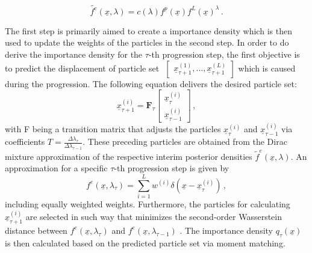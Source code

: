 \documentclass[a4paper]{IEEEtran}
\begin{document}
\begin{equation}
    \tilde{f^e}(\underline{x},\lambda) = c(\lambda)f^p(\underline{x})f^L(\underline{x})^{\lambda} \,.
    \label{eq:homtopy_importance_sampling}
\end{equation}

The first step is primarily aimed to create a importance density which is then used to update the weights of the particles in the second step.
In order to do derive the importance density for the $\tau$-th progression step, the first objective is to predict the displacement of particle set $\,\, \begin{bmatrix} \underline{x}_{\tau+1}^{(1)}, \dotsc, \underline{x}_{\tau+1}^{(L)} \end{bmatrix}$ which is caused during the progression.
The following equation delivers the desired particle set:
\begin{equation}
    \underline{x}_{\tau + 1}^{(i)} = \textbf{F}_{\tau}
        \begin{bmatrix}
            \underline{x}_{\tau}^{(i)} \\ 
            \underline{x}_{\tau -1}^{(i)}
        \end{bmatrix} \,,
\end{equation}
with F being a transition matrix that adjusts the particles $\underline{x}_{\tau}^{(i)}$ and $\underline{x}_{\tau-1}^{(i)}$ via coefficients $T = \frac{\Delta\lambda_{\tau}}{\Delta\lambda_{\tau-1}}$\cite{chlebek2016a}.
These preceding particles are obtained from the Dirac mixture approximation of the respective interim posterior densities $\tilde{f}^{e}(\underline{x}, \lambda)$.
An approximation for a specific $\tau$-th progression step is given by
 \begin{equation}
    f^{e}(\underline{x}, \lambda_{\tau}) = \sum_{i=1}^{L}w^{(i)}\delta(\underline{x}-\underline{x}_{\tau}^{(i)}) \,,
    \label{eq:dirac_approx_interim_posterior}
 \end{equation}
including equally weighted weights.
Furthermore, the particles for calculating $\underline{x}_{\tau + 1}^{(i)}$ are selected in such way that minimizes the second-order Wasserstein distance between  $f^{e}(\underline{x}, \lambda_{\tau})$ and $f^{e}(\underline{x}, \lambda_{\tau-1})$ \cite{chlebek2016a}. 
The importance density $q_{\tau}(\underline{x})$ is then calculated based on the predicted particle set via moment matching.
\end{document}

